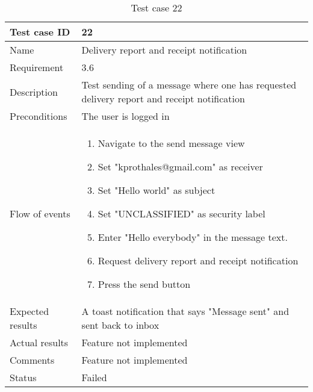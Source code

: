 		\begin{table}
			\begin{tabular}{l|p{10cm}}
				Test case ID & 22 \\ \hline
				Name & Delivery report and receipt notification\\ \hline
				Requirement & 3.6\\ \hline
				Description & Test sending of a message where one has requested delivery report and receipt notification\\ \hline
				Preconditions & The user is logged in\\ \hline
				Flow of events & 
					\begin{enumerate}
						\item{}Navigate to the send message view
						\item{}Set "kprothales@gmail.com" as receiver
						\item{}Set "Hello world" as subject
						\item{}Set "UNCLASSIFIED" as security label
						\item{}Enter "Hello everybody" in the message text.
						\item{}Request delivery report and receipt notification
						\item{}Press the send button
					\end{enumerate} \\ \hline
				Expected results & A toast notification that says "Message sent" and sent back to inbox \\ \hline
				Actual results & Feature not implemented\\ \hline
				Comments &Feature not implemented\\ \hline
				Status &Failed \\ \hline
			\end{tabular}
			\caption{Test case 22} \label{tab:case22}
		\end{table}

